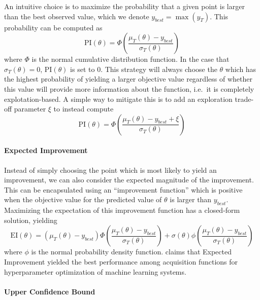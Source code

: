 An intuitive choice is to maximize the probability that a given point is larger than the best observed value, which we denote $y_{best} = \max(y_T)$.
This probability can be computed as
\begin{equation}
        \mathrm{PI}(\theta) = \Phi\left(\frac{\mu_T(\theta) - y_{best}}{\sigma_T(\theta)}\right)
        \label{eq:probability_of_improvement}
\end{equation}
where $\Phi$ is the normal cumulative distribution function.
In the case that $\sigma_T(\theta) = 0$, $\mathrm{PI}(\theta)$ is set to $0$.
This strategy will always choose the $\theta$ which has the highest probability of yielding a larger objective value regardless of whether this value will provide more information about the function, i.e.\ it is completely explotation-based.
A simple way to mitigate this is to add an exploration trade-off parameter $\xi$ to instead compute
\begin{equation}
        \mathrm{PI}(\theta) = \Phi\left(\frac{\mu_T(\theta) - y_{best} + \xi}{\sigma_T(\theta)}\right)
\end{equation}

\paragraph{Expected Improvement}

Instead of simply choosing the point which is most likely to yield an improvement, we can also consider the expected magnitude of the improvement.
This can be encapsulated using an ``improvement function'' which is positive when the objective value for the predicted value of $\theta$ is larger than $y_{best}$.
Maximizing the expectation of this improvement function has a closed-form solution, yielding
\begin{equation}
        \mathrm{EI}(\theta) = (\mu_T(\theta) - y_{best})\Phi\left(\frac{\mu_T(\theta) - y_{best}}{\sigma_T(\theta)}\right) + \sigma(\theta)\phi\left(\frac{\mu_T(\theta) - y_{best}}{\sigma_T(\theta)}\right)
\end{equation}
where $\phi$ is the normal probability density function.
\cite{} claims that Expected Improvement yielded the best performance among acquisition functions for hyperparameter optimization of machine learning systems.

\paragraph{Upper Confidence Bound}

